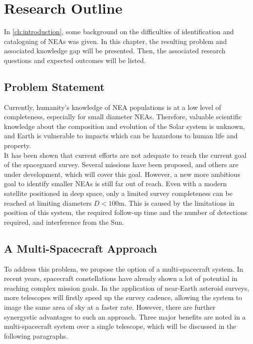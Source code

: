 \chapter{Research Outline}
In \autoref{ch:introduction}, some background on the difficulties of identification and cataloguing of NEAs was given. In this chapter, the resulting problem and associated knowledge gap will be presented. Then, the associated research questions and expected outcomes will be listed.

\section{Problem Statement}
Currently, humanity's knowledge of NEA populations is at a low level of completeness, especially for small diameter NEAs. Therefore, valuable scientific knowledge about the composition and evolution of the Solar system is unknown, and Earth is vulnerable to impacts which can be hazardous to human life and property. \\

It has been shown that current efforts are not adequate to reach the current goal of the spaceguard survey. Several missions have been proposed, and others are under development, which will cover this goal. However, a new more ambitious goal to identify smaller NEAs is still far out of reach. Even with a modern satellite positioned in deep space, only a limited survey completeness can be reached at limiting diameters $D < 100 \mathrm{m}$. This is caused by the limitations in position of this system, the required follow-up time and the number of detections required, and interference from the Sun.

\section{A Multi-Spacecraft Approach}
\label{sec:researchmultispacecraft}
To address this problem, we propose the option of a multi-spacecraft system. In recent years, spacecraft constellations have already shown a lot of potential in reaching complex mission goals. In the application of near-Earth asteroid surveys, more telescopes will firstly speed up the survey cadence, allowing the system to image the same area of sky at a faster rate. However, there are further synergystic advantages to such an approach. Three major benefits are noted in a multi-spacecraft system over a single telescope, which will be discussed in the following paragraphs.\\

